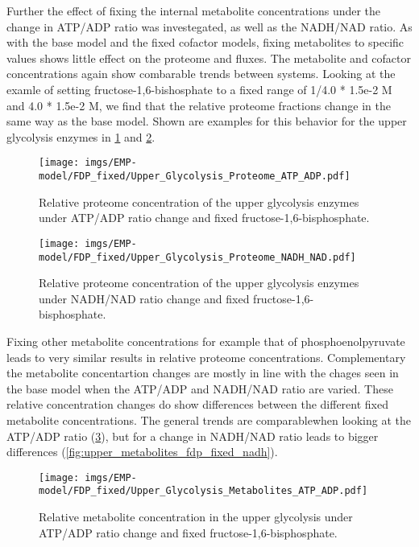 Further the effect of fixing the internal metabolite concentrations under the change in ATP/ADP ratio was investegated, as well as the NADH/NAD ratio. As with the base model and the fixed cofactor models, fixing metabolites to specific values shows little effect on the proteome and fluxes. The metabolite and cofactor concentrations again show combarable trends between systems. Looking at the examle of setting fructose-1,6-bishosphate to a fixed range of 1/4.0 * 1.5e-2 M and 4.0 * 1.5e-2 M, we find that the relative proteome fractions change in the same way as the base model. Shown are examples for this behavior for the upper glycolysis enzymes in \ref{fig:upper_proteome_fdp_fixed_atp} and \ref{fig:upper_proteome_fdp_fixed_nadh}.
\begin{figure}[H]
    \centering
    \texttt{[image: imgs/EMP-model/FDP\_fixed/Upper\_Glycolysis\_Proteome\_ATP\_ADP.pdf]}
    \caption{Relative proteome concentration of the upper glycolysis enzymes under ATP/ADP ratio change and fixed fructose-1,6-bisphosphate.}
    \label{fig:upper_proteome_fdp_fixed_atp}
\end{figure}

\begin{figure}[H]
    \centering
    \texttt{[image: imgs/EMP-model/FDP\_fixed/Upper\_Glycolysis\_Proteome\_NADH\_NAD.pdf]}
    \caption{Relative proteome concentration of the upper glycolysis enzymes under NADH/NAD ratio change and fixed fructose-1,6-bisphosphate.}
    \label{fig:upper_proteome_fdp_fixed_nadh}
\end{figure}

Fixing other metabolite concentrations for example that of phosphoenolpyruvate leads to very similar results in relative proteome concentrations. Complementary the metabolite concentartion changes are mostly in line with the chages seen in the base model when the ATP/ADP and NADH/NAD ratio are varied. These relative concentration changes do show differences between the different fixed metabolite concentrations. The general trends are comparablewhen looking at the ATP/ADP ratio (\ref{fig:upper_metabolites_fdp_fixed_atp}), but for a change in NADH/NAD ratio leads to bigger differences (\ref{fig:upper_metabolites_fdp_fixed_nadh}). 
\begin{figure}[H]
    \centering
    \texttt{[image: imgs/EMP-model/FDP\_fixed/Upper\_Glycolysis\_Metabolites\_ATP\_ADP.pdf]}
    \caption{Relative metabolite concentration in the upper glycolysis under ATP/ADP ratio change and fixed fructose-1,6-bisphosphate.}
    \label{fig:upper_metabolites_fdp_fixed_atp}
\end{figure}

